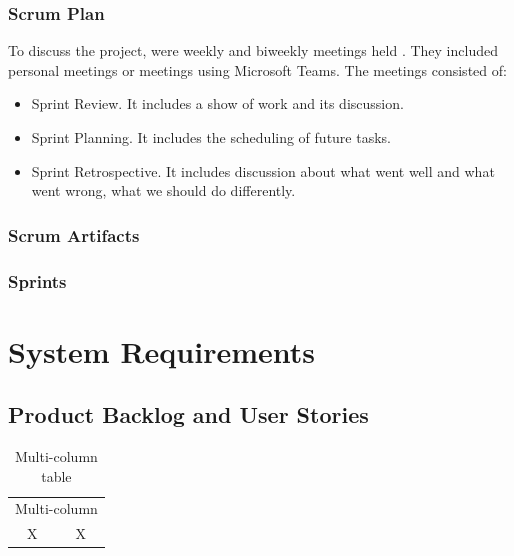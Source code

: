 \documentclass{scrartcl}
\begin{document}
  	    \subsubsection{Scrum Plan}
  	    To discuss the project, were weekly and biweekly meetings held . They included personal meetings or meetings using Microsoft Teams. The meetings consisted of:
  	    \begin{itemize}
  	    \item Sprint Review. It includes a show of work and its discussion.
  	    \item Sprint Planning. It includes the scheduling of future tasks.
  	    \item Sprint Retrospective. It includes discussion about what went well and what went wrong, what we should do differently. 
  	    \end{itemize}
  		\subsubsection{Scrum Artifacts }
  		
  		\subsubsection{Sprints}
\section{System Requirements}





\subsection{Product Backlog and User Stories}

\begin{table}[ht]
\caption{Multi-column table}
\begin{center}
\begin{tabular}{cc}
    \hline
    \multicolumn{2}{c}{Multi-column}\\
    X&X\\
    \hline
\end{tabular}
\end{center}
\label{tab:multicol}
\end{table}
\end{document}
